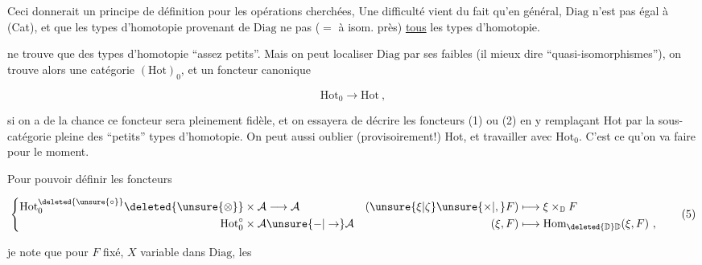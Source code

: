
Ceci donnerait un principe de définition pour les opérations cherchées, Une difficulté vient du fait qu'en général, $\mathrm{Diag}$ n'est pas égal à (Cat), et que les types d'homotopie provenant de $\mathrm{Diag}$ ne   pas ($=$ à isom. près) \uline{tous} les types d'homotopie.

  ne trouve que des types d'homotopie ``assez petits''. Mais on peut localiser $\mathrm{Diag}$ par ses   faibles (il  mieux dire ``quasi-isomorphismes''), on trouve alors une catégorie  $(\mathrm{Hot})_0$, et un foncteur canonique

\[\mathrm{Hot}_0\longrightarrow\mathrm{Hot}\ ,\]

si on a de la chance ce foncteur sera pleinement fidèle, et on  essayera de décrire les foncteurs (1) ou (2) en y remplaçant Hot par la sous-catégorie pleine des ``petits'' types d'homotopie. On peut aussi oublier (provisoirement!) Hot, et travailler avec $\mathrm{Hot}_0$. C'est ce qu'on va faire pour le moment.

Pour pouvoir définir les foncteurs

\[
\left\{\begin{aligned}
\mathrm{Hot}_0^{\deleted{\unsure{\circ}}}\deleted{\unsure{\otimes}}\times\mathcal A&\longrightarrow\mathcal A&
(\unsure{\xi|\zeta}\unsure{\times|,} F)&\longmapsto\xi\times_{\mathbb D}F\\
\mathrm{Hot}_0^\circ\times\mathcal A&\unsure{-|\to}\mathcal A&
(\xi,F)&\longmapsto\mathrm{Hom}_{\deleted{\mathbb D}\mathbb D}(\xi,F)\ ,
\end{aligned}\right.\tag*{(5)}
\]

je note que pour $F$ fixé, $X$ variable dans $\mathrm{Diag}$, les

